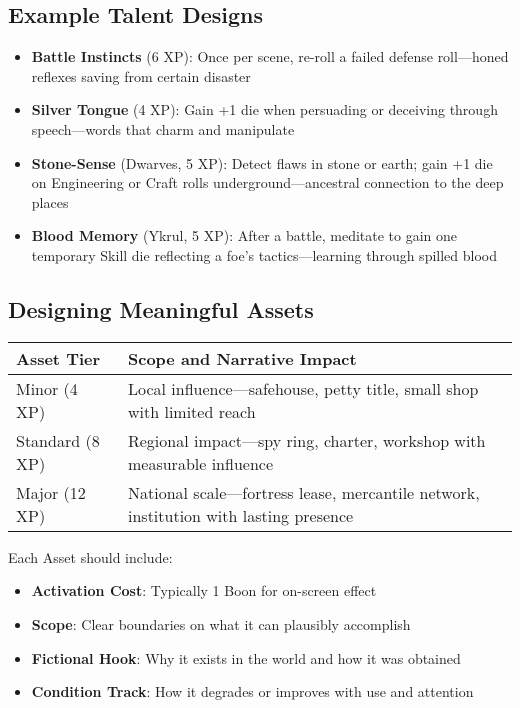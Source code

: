\subsection*{Example Talent Designs}

\begin{itemize}
    \item \textbf{Battle Instincts} (6 XP): Once per scene, re-roll a failed defense roll---honed reflexes saving from certain disaster
    \item \textbf{Silver Tongue} (4 XP): Gain +1 die when persuading or deceiving through speech---words that charm and manipulate
    \item \textbf{Stone-Sense} (Dwarves, 5 XP): Detect flaws in stone or earth; gain +1 die on Engineering or Craft rolls underground---ancestral connection to the deep places
    \item \textbf{Blood Memory} (Ykrul, 5 XP): After a battle, meditate to gain one temporary Skill die reflecting a foe's tactics---learning through spilled blood
\end{itemize}

\subsection*{Designing Meaningful Assets}

\begin{fatebox}
\begin{tabularx}{\textwidth}{lX}
\toprule
\textbf{Asset Tier} & \textbf{Scope and Narrative Impact} \\
\midrule
Minor (4 XP) & Local influence---safehouse, petty title, small shop with limited reach \\
Standard (8 XP) & Regional impact---spy ring, charter, workshop with measurable influence \\
Major (12 XP) & National scale---fortress lease, mercantile network, institution with lasting presence \\
\bottomrule
\end{tabularx}
\end{fatebox}

Each Asset should include:
\begin{itemize}
    \item \textbf{Activation Cost}: Typically 1 Boon for on-screen effect
    \item \textbf{Scope}: Clear boundaries on what it can plausibly accomplish
    \item \textbf{Fictional Hook}: Why it exists in the world and how it was obtained
    \item \textbf{Condition Track}: How it degrades or improves with use and attention
\end{itemize}

